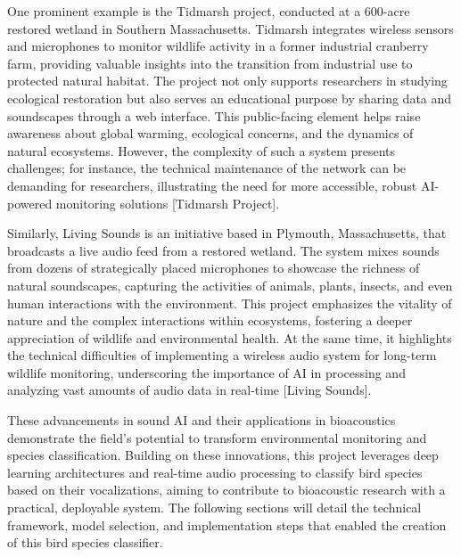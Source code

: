 One prominent example is the Tidmarsh project, conducted at a 600-acre restored wetland in Southern Massachusetts. Tidmarsh integrates wireless sensors and microphones to monitor wildlife activity in a former industrial cranberry farm, providing valuable insights into the transition from industrial use to protected natural habitat. The project not only supports researchers in studying ecological restoration but also serves an educational purpose by sharing data and soundscapes through a web interface. This public-facing element helps raise awareness about global warming, ecological concerns, and the dynamics of natural ecosystems. However, the complexity of such a system presents challenges; for instance, the technical maintenance of the network can be demanding for researchers, illustrating the need for more accessible, robust AI-powered monitoring solutions [Tidmarsh Project].

Similarly, Living Sounds is an initiative based in Plymouth, Massachusetts, that broadcasts a live audio feed from a restored wetland. The system mixes sounds from dozens of strategically placed microphones to showcase the richness of natural soundscapes, capturing the activities of animals, plants, insects, and even human interactions with the environment. This project emphasizes the vitality of nature and the complex interactions within ecosystems, fostering a deeper appreciation of wildlife and environmental health. At the same time, it highlights the technical difficulties of implementing a wireless audio system for long-term wildlife monitoring, underscoring the importance of AI in processing and analyzing vast amounts of audio data in real-time [Living Sounds].

These advancements in sound AI and their applications in bioacoustics demonstrate the field’s potential to transform environmental monitoring and species classification. Building on these innovations, this project leverages deep learning architectures and real-time audio processing to classify bird species based on their vocalizations, aiming to contribute to bioacoustic research with a practical, deployable system. The following sections will detail the technical framework, model selection, and implementation steps that enabled the creation of this bird species classifier.

